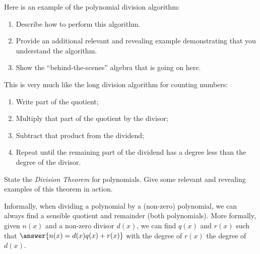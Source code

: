 \documentclass[nooutcomes]{ximera}
\begin{document}
\begin{problem}Here is an example of the polynomial division algorithm:
\begin{image}  
\end{image}

\begin{enumerate}
\item Describe how to perform this algorithm.
\item Provide an additional relevant and revealing example
  demonstrating that you understand the algorithm.
\item Show the ``behind-the-scenes'' algebra that is going on here.
\end{enumerate}
\begin{freeResponse}
\begin{hint}
This is very much like the long division algorithm for counting numbers: 
\begin{enumerate} 
\item Write part of the quotient;
\item Multiply that part of the quotient by the divisor;
\item Subtract that product from the dividend; 
\item Repeat until the remaining part of the dividend has a degree less than the degree of the divisor. 
\end{enumerate}
\end{hint}
\end{freeResponse}
\end{problem} 

\begin{problem}State the \textit{Division Theorem} for polynomials. Give some
  relevant and revealing examples of this theorem in action.
\begin{freeResponse}
\begin{hint}
Informally, when dividing a polynomial by a (non-zero) polynomial, we can always find a sensible quotient and remainder (both polynomials).  More formally, given $n(x)$ and a non-zero divisor $d(x)$, we can find $q(x)$ and $r(x)$ such that $\answer{n(x)=d(x)q(x)+r(x)}$ with the degree of $r(x)$  the degree of $d(x)$.  
\end{hint}
\end{freeResponse}
\end{problem} 
\end{document}
